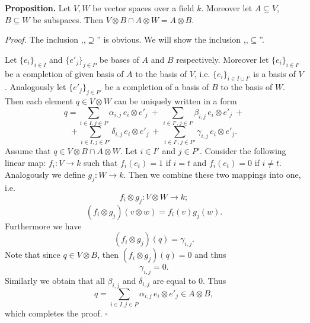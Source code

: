 \documentclass[12pt]{article}
\begin{document}
\textbf{Proposition.} Let $V,W$ be vector spaces over a field $k$. Moreover let $A\subseteq V$, $B\subseteq W$ be subspaces. Then $V\otimes B\cap A\otimes W=A\otimes B$.

\textit{Proof.} The inclusion ,,$\supseteq$'' is obvious. We will show the inclusion ,,$\subseteq$''.

Let $\{e_i\}_{i\in I}$ and $\{e'_j\}_{j\in P}$ be bases of $A$ and $B$ respectively. Moreover let $\{e_i\}_{i\in I'}$ be a completion of given basis of $A$ to the basis of $V$, i.e. $\{e_i\}_{i\in I\cup I'}$ is a basis of $V$. Analogously let $\{e'_j\}_{j\in P'}$ be a completion of a basis of $B$ to the basis of $W$. Then each element $q\in V\otimes W$ can be uniquely written in a form 
$$q=\sum_{i\in I,j\in P}\alpha_{i,j}\, e_i\otimes e'_j\ + \ \sum_{i\in I',j\in P}\beta_{i,j}\, e_i\otimes e'_j\ +$$
$$+\ \sum_{i\in I,j\in P'}\delta_{i,j}\, e_i\otimes e'_j\ +\ \sum_{i\in I',j\in P'}\gamma_{i,j}\, e_i\otimes e'_j.$$
Assume that $q\in V\otimes B\cap A\otimes W.$ Let $i\in I'$ and $j\in P'$. Consider the following linear map: $f_i:V\to k$ such that $f_i(e_t)=1$ if $i=t$ and $f_i(e_t)=0$ if $i\neq t$. Analogously we define $g_j:W\to k$. Then we combine these two mappings into one, i.e. $$f_i\otimes g_j:V\otimes W\to k;$$ $$(f_i\otimes g_j)(v\otimes w)=f_i(v)g_j(w).$$ Furthermore we have $$(f_i\otimes g_j)(q)=\gamma_{i,j}.$$ Note that since $q\in V\otimes B$, then $(f_i\otimes g_j)(q)=0$ and thus $$\gamma_{i,j}=0.$$ Similarly we obtain that all $\beta_{i,j}$ and $\delta_{i,j}$ are equal to $0$. Thus $$q=\sum_{i\in I,j\in P}\alpha_{i,j}\, e_i\otimes e'_j\in A\otimes B,$$ which completes the proof. $\square$
\end{document}
